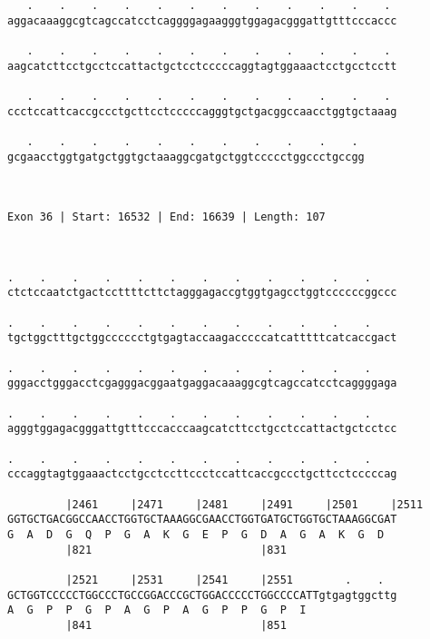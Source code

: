 \documentclass{article}
\begin{document}
\begin{Verbatim}
   .    .    .    .    .    .    .    .    .    .    .    . 
aggacaaaggcgtcagccatcctcaggggagaagggtggagacgggattgtttcccaccc
                                                            
   .    .    .    .    .    .    .    .    .    .    .    . 
aagcatcttcctgcctccattactgctcctcccccaggtagtggaaactcctgcctcctt
                                                            
   .    .    .    .    .    .    .    .    .    .    .    . 
ccctccattcaccgccctgcttcctcccccagggtgctgacggccaacctggtgctaaag
                                                            
   .    .    .    .    .    .    .    .    .    .    . 
gcgaacctggtgatgctggtgctaaaggcgatgctggtccccctggccctgccgg
                                                       
                                                       
 
Exon 36 | Start: 16532 | End: 16639 | Length: 107



.    .    .    .    .    .    .    .    .    .    .    .    
ctctccaatctgactccttttcttctagggagaccgtggtgagcctggtccccccggccc
                                                            
.    .    .    .    .    .    .    .    .    .    .    .    
tgctggctttgctggcccccctgtgagtaccaagacccccatcatttttcatcaccgact
                                                            
.    .    .    .    .    .    .    .    .    .    .    .    
gggacctgggacctcgagggacggaatgaggacaaaggcgtcagccatcctcaggggaga
                                                            
.    .    .    .    .    .    .    .    .    .    .    .    
agggtggagacgggattgtttcccacccaagcatcttcctgcctccattactgctcctcc
                                                            
.    .    .    .    .    .    .    .    .    .    .    .    
cccaggtagtggaaactcctgcctccttccctccattcaccgccctgcttcctcccccag
                                                            
         |2461     |2471     |2481     |2491     |2501     |2511
GGTGCTGACGGCCAACCTGGTGCTAAAGGCGAACCTGGTGATGCTGGTGCTAAAGGCGAT
G  A  D  G  Q  P  G  A  K  G  E  P  G  D  A  G  A  K  G  D  
         |821                          |831                 
  
         |2521     |2531     |2541     |2551        .    .  
GCTGGTCCCCCTGGCCCTGCCGGACCCGCTGGACCCCCTGGCCCCATTgtgagtggcttg
A  G  P  P  G  P  A  G  P  A  G  P  P  G  P  I              
         |841                          |851                 
  

\end{Verbatim}
\end{document}
